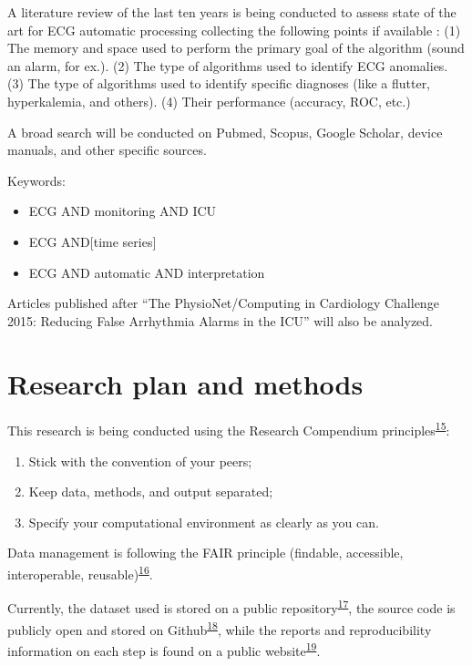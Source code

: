 \documentclass[12pt,twoside]{reedthesis}
\providecommand{\tightlist}{%
  \setlength{\itemsep}{0pt}\setlength{\parskip}{0pt}}
\begin{document}
A literature review of the last ten years is being conducted to assess state of the art for ECG automatic processing
collecting the following points if available : (1) The memory and space used to perform the primary goal of the
algorithm (sound an alarm, for ex.). (2) The type of algorithms used to identify ECG anomalies. (3) The type of
algorithms used to identify specific diagnoses (like a flutter, hyperkalemia, and others). (4) Their performance
(accuracy, ROC, etc.)

A broad search will be conducted on Pubmed, Scopus, Google Scholar, device manuals, and other specific sources.

Keywords:
\begin{itemize}
\tightlist
\item
  ECG AND monitoring AND ICU
\item
  ECG AND{[}time series{]}
\item
  ECG AND automatic AND interpretation
\end{itemize}
Articles published after ``The PhysioNet/Computing in Cardiology Challenge 2015: Reducing False Arrhythmia Alarms in the
ICU'' will also be analyzed.

\hypertarget{research-plan-and-methods}{%
\section{Research plan and methods}\label{research-plan-and-methods}}

This research is being conducted using the Research Compendium principles\textsuperscript{\protect\hyperlink{ref-compendium2019}{15}}:
\begin{enumerate}
\def\labelenumi{\arabic{enumi}.}
\tightlist
\item
  Stick with the convention of your peers;
\item
  Keep data, methods, and output separated;
\item
  Specify your computational environment as clearly as you can.
\end{enumerate}
Data management is following the FAIR principle (findable, accessible, interoperable, reusable)\textsuperscript{\protect\hyperlink{ref-wilkinson2016}{16}}.

Currently, the dataset used is stored on a public repository\textsuperscript{\protect\hyperlink{ref-franz_dataset}{17}}, the source code is publicly open and
stored on Github\textsuperscript{\protect\hyperlink{ref-franz_github}{18}}, while the reports and reproducibility information on each step is found on a public
website\textsuperscript{\protect\hyperlink{ref-franz_website}{19}}.
\end{document}
